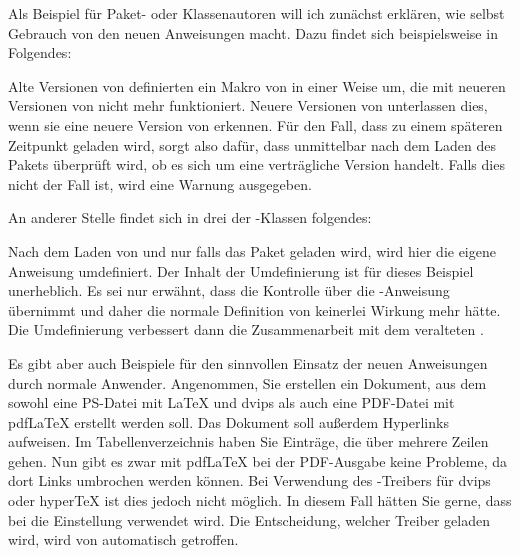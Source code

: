 \begin{Example}
  Als Beispiel für Paket- oder Klassenautoren will ich zunächst
  erklären, wie \KOMAScript{} selbst Gebrauch von den neuen
  Anweisungen macht. Dazu findet sich beispielsweise in 
  Folgendes:
\begin{lstcode}
\end{lstcode}
  Alte Versionen von  definierten ein Makro von
   in einer Weise um, die mit neueren Versionen
  von \KOMAScript{} nicht mehr funktioniert. Neuere Versionen von
   unterlassen dies, wenn sie eine neuere Version
  von \KOMAScript{} erkennen. Für den Fall, dass 
  zu einem späteren Zeitpunkt geladen wird, sorgt also 
  dafür, dass unmittelbar nach dem Laden des Pakets überprüft wird, ob
  es sich um eine verträgliche Version handelt. Falls dies nicht der
  Fall ist, wird eine Warnung ausgegeben.

  An anderer Stelle findet sich in drei der \KOMAScript-Klassen folgendes:
\begin{lstcode}
  \AfterPackage{caption2}{%
    \renewcommand*{\setcapindent}{%
\end{lstcode}%
  Nach dem Laden von  und nur falls das Paket
  geladen wird, wird hier die \KOMAScript{} eigene Anweisung
   umdefiniert. Der Inhalt der Umdefinierung
  ist für dieses Beispiel unerheblich. Es sei nur erwähnt, dass
   die Kontrolle über die
  -Anweisung übernimmt und daher die normale
  Definition von  keinerlei Wirkung mehr
  hätte. Die Umdefinierung verbessert dann die Zusammenarbeit mit dem
  veralteten .

  Es gibt aber auch Beispiele für den sinnvollen Einsatz der neuen
  Anweisungen durch normale Anwender. Angenommen, Sie erstellen ein
  Dokument, aus dem sowohl eine PS-Datei mit \LaTeX{} und dvips als auch
  eine PDF-Datei mit \mbox{pdf\LaTeX} erstellt werden soll. Das Dokument soll
  außerdem Hyperlinks aufweisen. Im Tabellenverzeichnis haben Sie
  Einträge, die über mehrere Zeilen gehen. Nun gibt es zwar mit
  \mbox{pdf\LaTeX} bei der PDF-Ausgabe keine Probleme, da dort Links
  umbrochen werden können. Bei Verwendung des
  -Treibers für dvips oder
  \mbox{hyper\TeX} ist dies jedoch nicht
  möglich. In diesem Fall hätten Sie gerne, dass bei
   die Einstellung  verwendet
  wird. Die Entscheidung, welcher Treiber geladen wird, wird von
   automatisch getroffen.


\end{Example}
